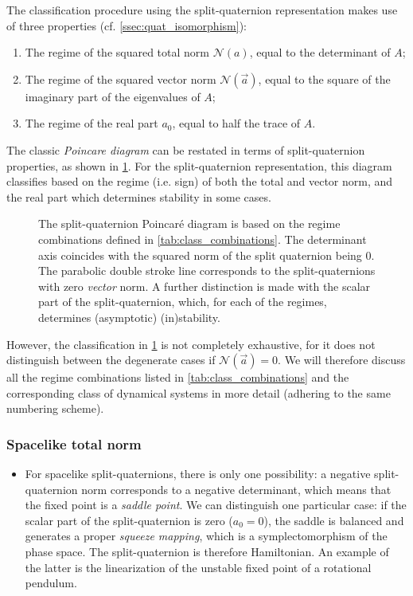 The classification procedure using the split-quaternion representation makes use of three properties (cf. \cref{ssec:quat_isomorphism}): 
\begin{enumerate}[label=(\roman*), align=left, leftmargin=1.5cm]
    \item The regime of the squared total norm $\mathscr{N}(a)$, equal to the determinant of $A$;
    \item The regime of the squared vector norm $\mathscr{N}(\vec{a})$, equal to the square of the imaginary part of the eigenvalues of $A$;
    \item The regime of the real part $a_0$, equal to half the trace of $A$.
\end{enumerate}
The classic \emph{Poincare diagram} can be restated in terms of split-quaternion properties, as shown in \cref{fig:poincare_diagram}. For the split-quaternion representation, this diagram classifies based on the regime (i.e. sign) of both the total and vector norm, and the real part which determines stability in some cases.

\begin{figure}[ht!]
    \centering
    
    \caption{The split-quaternion Poincaré diagram is based on the regime combinations defined in \cref{tab:class_combinations}. The determinant axis coincides with the squared norm of the split quaternion being 0. The parabolic double stroke line corresponds to the split-quaternions with zero \emph{vector} norm. 
    A further distinction is made with the scalar part of the split-quaternion, which, for each of the regimes, determines (asymptotic) (in)stability.}
    \label{fig:poincare_diagram}
\end{figure}

However, the classification in \cref{fig:poincare_diagram} is not completely exhaustive, for it does not distinguish between the degenerate cases if $\mathscr{N}(\vec{a}) = 0$.
We will therefore discuss all the regime combinations listed in \cref{tab:class_combinations} and the corresponding class of dynamical systems in more detail (adhering to the same numbering scheme).

\subsubsection*{Spacelike total norm}
    \begin{itemize}
        \item[\circled{1}] For spacelike split-quaternions, there is only one possibility: a negative split-quaternion norm corresponds to a negative determinant, which means that the fixed point is a \emph{saddle point}. We can distinguish one particular case: if the scalar part of the split-quaternion is zero (\(a_0 = 0\)), the saddle is balanced and generates a proper \emph{squeeze mapping}, which is a symplectomorphism of the phase space. The split-quaternion is therefore Hamiltonian. An example of the latter is the linearization of the unstable fixed point of a rotational pendulum.
    \end{itemize}

